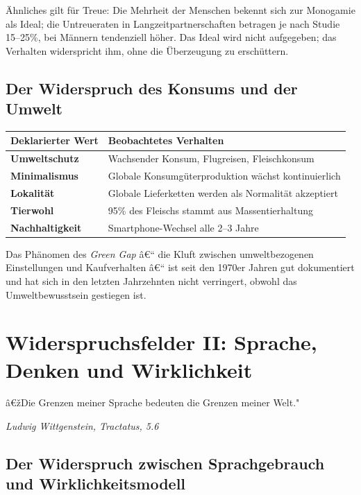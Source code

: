 ﻿\documentclass[12pt, a4paper]{article}
\begin{document}
Ähnliches gilt für Treue: Die Mehrheit der Menschen bekennt sich zur
Monogamie als Ideal; die Untreueraten in Langzeitpartnerschaften betragen
je nach Studie 15--25\%, bei Männern tendenziell höher. Das Ideal wird nicht
aufgegeben; das Verhalten widerspricht ihm, ohne die Überzeugung zu erschüttern.

\subsection{Der Widerspruch des Konsums und der Umwelt}

\medskip
\begin{tabular}{>{\bfseries}p{5cm} p{8cm}}
\toprule
Deklarierter Wert & Beobachtetes Verhalten \\
\midrule
Umweltschutz & Wachsender Konsum, Flugreisen, Fleischkonsum \\
Minimalismus & Globale Konsumgüterproduktion wächst kontinuierlich \\
Lokalität & Globale Lieferketten werden als Normalität akzeptiert \\
Tierwohl & 95\% des Fleischs stammt aus Massentierhaltung \\
Nachhaltigkeit & Smartphone-Wechsel alle 2--3 Jahre \\
\bottomrule
\end{tabular}
\medskip

Das Phänomen des \emph{Green Gap} â€“ die Kluft zwischen umweltbezogenen
Einstellungen und Kaufverhalten â€“ ist seit den 1970er Jahren gut dokumentiert
und hat sich in den letzten Jahrzehnten nicht verringert, obwohl das
Umweltbewusstsein gestiegen ist.

\section{Widerspruchsfelder II: Sprache, Denken und Wirklichkeit}

\epigraph{â€žDie Grenzen meiner Sprache bedeuten die Grenzen meiner Welt."}%
{\textit{Ludwig Wittgenstein, Tractatus, 5.6}}

\subsection{Der Widerspruch zwischen Sprachgebrauch und Wirklichkeitsmodell}
\end{document}
